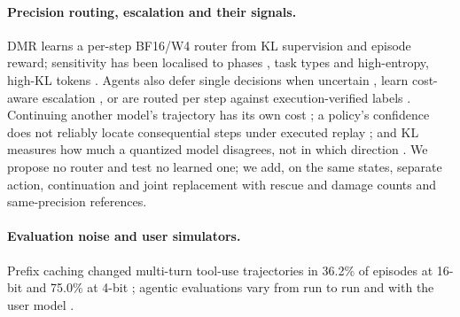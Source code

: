 \paragraph{Precision routing, escalation and their signals.} DMR \citep{li2026dynamicmp} learns a per-step BF16/W4 router from KL supervision and episode reward; sensitivity has been localised to phases \citep{lu2026mixquant}, task types \citep{zhang2026quantclaw} and high-entropy, high-KL tokens \citep{lotfi2026quantized}. Agents also defer single decisions when uncertain \citep{piatrashyn2026redact}, learn cost-aware escalation \citep{lei2026tacit}, or are routed per step against execution-verified labels \citep{yang2026twinrouterbench}. Continuing another model's trajectory has its own cost \citep{ganz2026handoff}; a policy's confidence does not reliably locate consequential steps under executed replay \citep{zhang2026credit}; and KL measures how much a quantized model disagrees, not in which direction \citep{nikolic2026displacement}. We propose no router and test no learned one; we add, on the same states, separate action, continuation and joint replacement with rescue and damage counts and same-precision references.

\paragraph{Evaluation noise and user simulators.} Prefix caching changed multi-turn tool-use trajectories in 36.2\% of episodes at 16-bit and 75.0\% at 4-bit \citep{patodiya2026same}; agentic evaluations vary from run to run \citep{bjarnason2026randomness,chen2026noisefloor} and with the user model \citep{seshadri2026lost,jain2026userproxybench}. %
